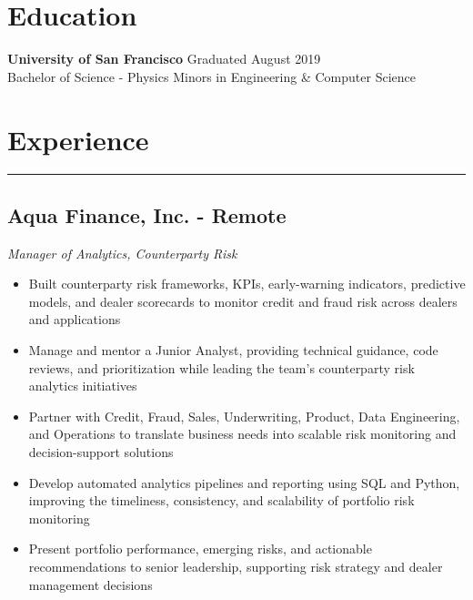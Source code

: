\documentclass[11pt,a4paper]{article}
\newenvironment{myitemize}
{ \begin{itemize}[label={--}, leftmargin=*]
		\setlength{\itemsep}{0pt}
		\setlength{\parskip}{0pt}
		\setlength{\parsep}{0pt}     }
	{ \end{itemize}                  }
\begin{document}
	
	
\section*{Education}
	\vspace{-8mm} %
	\noindent\makebox[\linewidth]{\rule{\textwidth}{0.4pt}}
	\textbf{University of San Francisco} \hfill Graduated August 2019 \\
	Bachelor of Science - Physics \hfill Minors in Engineering \& Computer Science
	
		\vspace{-5mm} %
	
	\section*{Experience}
	\vspace{-3mm} %
	\hrule
	\vspace{3mm} %
	
	
	
\subsection*{Aqua Finance, Inc. - Remote \hfill
	\vspace{-1mm}
	 }
\vspace{-1.5mm}
\textit{Manager of Analytics, Counterparty Risk}
\vspace{-2.5mm}
\begin{myitemize}
	\item Built counterparty risk frameworks, KPIs, early-warning indicators, predictive models, and dealer scorecards to monitor credit and fraud risk across dealers and applications
	\item Manage and mentor a Junior Analyst, providing technical guidance, code reviews, and prioritization while leading the team's counterparty risk analytics initiatives
	\item Partner with Credit, Fraud, Sales, Underwriting, Product, Data Engineering, and Operations to translate business needs into scalable risk monitoring and decision-support solutions
	\item Develop automated analytics pipelines and reporting using SQL and Python, improving the timeliness, consistency, and scalability of portfolio risk monitoring
	\item Present portfolio performance, emerging risks, and actionable recommendations to senior leadership, supporting risk strategy and dealer management decisions
\end{myitemize}
	
\end{document}
